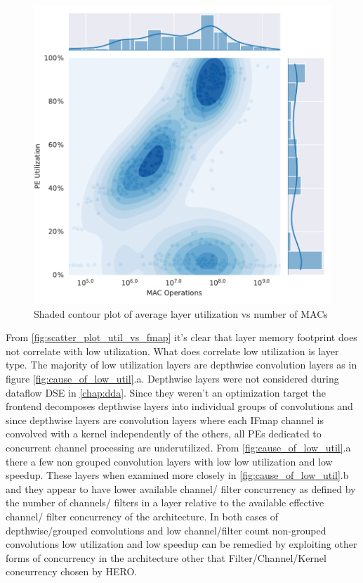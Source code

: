 \begin{figure}[ht]
    \centering
    \includegraphics[scale=0.58]{Plots/utilization/util_vs_macs.pdf}
    \caption{Shaded contour plot of average layer utilization vs number of MACs}
    \label{fig:utilization_macs_scaling}
\end{figure}

From \autoref{fig:scatter_plot_util_vs_fmap} it's clear that layer memory
footprint does not correlate with low utilization. What does correlate low
utilization is layer type. The majority of low utilization layers are depthwise
convolution layers as in figure \autoref{fig:cause_of_low_util}.a. Depthwise
layers were not considered during dataflow DSE in \autoref{chap:dda}. Since they
weren't an optimization target the frontend decomposes depthwise layers into
individual groups of convolutions and since depthwise layers are convolution
layers where each IFmap channel is convolved with a kernel independently of the
others, all PEs dedicated to concurrent channel processing are underutilized.
From \autoref{fig:cause_of_low_util}.a there a few non grouped convolution
layers with low low utilization and low speedup. These layers when examined more
closely in \autoref{fig:cause_of_low_util}.b and they appear to have lower
available channel/ filter concurrency as defined by the number of channels/
filters in a layer relative to the available effective channel/ filter
concurrency of the architecture. In both cases of depthwise/grouped convolutions
and low channel/filter count non-grouped convolutions low utilization and low
speedup can be remedied by exploiting other forms of concurrency in the
architecture other that Filter/Channel/Kernel concurrency chosen by HERO. 

